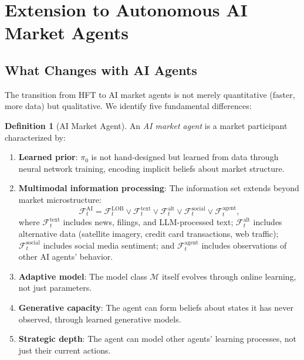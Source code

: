 \documentclass[12pt,a4paper]{article}
\theoremstyle{definition}
\newtheorem{definition}[theorem]{Definition}
\newcommand{\F}{\mathcal{F}}
\begin{document}
\section{Extension to Autonomous AI Market Agents}\label{sec:ai-agents}

\subsection{What Changes with AI Agents}

The transition from HFT to AI market agents is not merely quantitative (faster, more data) but qualitative. We identify five fundamental differences:

\begin{definition}[AI Market Agent]\label{def:ai-agent}
An \emph{AI market agent} is a market participant characterized by:
\begin{enumerate}
  \item \textbf{Learned prior}: $\pi_0$ is not hand-designed but learned from data through neural network training, encoding implicit beliefs about market structure.

  \item \textbf{Multimodal information processing}: The information set extends beyond market microstructure:
  \begin{equation}
    \F_t^{\mathrm{AI}} = \F_t^{\mathrm{LOB}} \vee \F_t^{\mathrm{text}} \vee \F_t^{\mathrm{alt}} \vee \F_t^{\mathrm{social}} \vee \F_t^{\mathrm{agent}},
  \end{equation}
  where $\F_t^{\mathrm{text}}$ includes news, filings, and LLM-processed text; $\F_t^{\mathrm{alt}}$ includes alternative data (satellite imagery, credit card transactions, web traffic); $\F_t^{\mathrm{social}}$ includes social media sentiment; and $\F_t^{\mathrm{agent}}$ includes observations of other AI agents' behavior.

  \item \textbf{Adaptive model}: The model class $\mathcal{M}$ itself evolves through online learning, not just parameters.

  \item \textbf{Generative capacity}: The agent can form beliefs about states it has never observed, through learned generative models.

  \item \textbf{Strategic depth}: The agent can model other agents' learning processes, not just their current actions.
\end{enumerate}
\end{definition}
\end{document}
